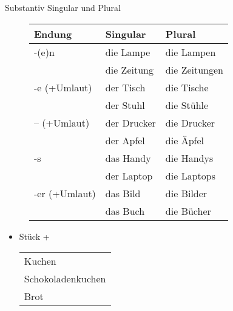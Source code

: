 \begin{semantics}{Substantiv}{}
Singular und Plural
\begin{figure}[H]
\begin{tabular}{|l|l|l|}
	\hline
	Endung & Singular & Plural \\
	\hline
	-(e)n & die Lampe & die Lampen \\
		  & die Zeitung & die Zeitungen \\
	\hline
	-e (+Umlaut) & der Tisch & die Tische \\
				 & der Stuhl & die Stühle \\
	\hline
	-- (+Umlaut) & der Drucker & die Drucker \\
				 & der Apfel & die Äpfel \\
	\hline
	-s & das Handy & die Handys \\
	   & der Laptop & die Laptops \\
	\hline
	-er (+Umlaut) & das Bild & die Bilder \\
				  & das Buch & die Bücher \\
	\hline
\end{tabular}
\end{figure}

\begin{itemize}
	\item Stück + \begin{tabular}{l}
			Kuchen \\
			Schokoladenkuchen \\
			Brot
		\end{tabular}
\end{itemize}
\end{semantics}
